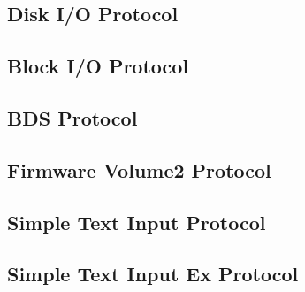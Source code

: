 \clearpage

\subsection{Disk \acs{I/O} Protocol}


\clearpage

\subsection{Block \acs{I/O} Protocol}


\clearpage

\subsection{\acf{BDS} Protocol}



\clearpage

\subsection{Firmware Volume2 Protocol}



\clearpage

\subsection{Simple Text Input Protocol}


\clearpage

\subsection{Simple Text Input Ex Protocol}



